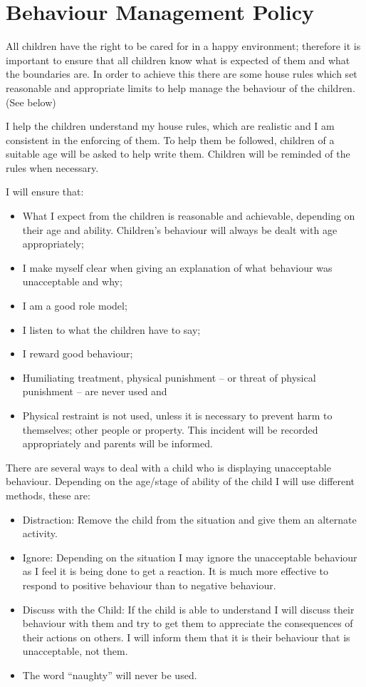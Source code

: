 \documentclass[10pt]{article}
\begin{document}
\section{Behaviour Management Policy}

All children have the right to be cared for in a happy environment;
therefore it is important to ensure that all children know what is
expected of them and what the boundaries are. In order to achieve this
there are some house rules which set reasonable and appropriate limits
to help manage the behaviour of the children. (See below)

I help the children understand my house rules, which are realistic and I
am consistent in the enforcing of them. To help them be followed,
children of a suitable age will be asked to help write them. Children
will be reminded of the rules when necessary.

I will ensure that:

\begin{itemize}
\item
  What I expect from the children is reasonable and achievable,
  depending on their age and ability. Children's behaviour will always
  be dealt with age appropriately; ~
\item
  I make myself clear when giving an explanation of what behaviour was
  unacceptable and why;~
\item
  I am a good role model;~
\item
  I listen to what the children have to say; ~
\item
  I reward good behaviour;~
\item
  Humiliating treatment, physical punishment -- or threat of physical
  punishment -- are never used and~
\item
  Physical restraint is not used, unless it is necessary to prevent
  harm to themselves; other people or property. This incident will be
  recorded appropriately and parents will be informed. ~
\end{itemize}

There are several ways to deal with a child who is displaying
unacceptable behaviour. Depending on the age/stage of ability of the
child I will use different methods, these are:

\begin{itemize}
\item
  Distraction: Remove the child from the situation and give them an
  alternate activity. ~
\item
  Ignore: Depending on the situation I may ignore the unacceptable
  behaviour as I feel it is being done to get a reaction. It is much
  more effective to respond to positive behaviour than to negative
  behaviour. ~
\item
  Discuss with the Child: If the child is able to understand I will
  discuss their behaviour with them and try to get them to appreciate
  the consequences of their actions on others. I will inform them that
  it is their behaviour that is unacceptable, not them.~
\item
  The word ``naughty'' will never be used.~
\end{itemize}
\end{document}
